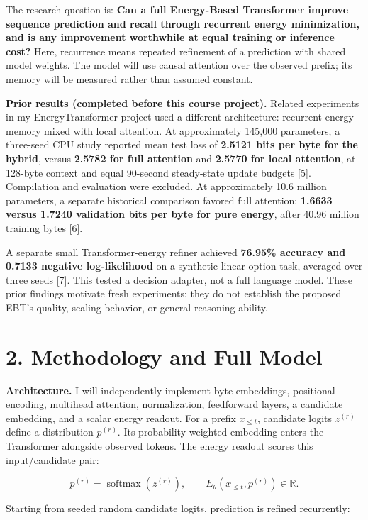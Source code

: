 \documentclass[11pt,letterpaper]{article}
\begin{document}
The research question is: \textbf{Can a full Energy-Based Transformer improve sequence prediction and recall through recurrent energy minimization, and is any improvement worthwhile at equal training or inference cost?} Here, recurrence means repeated refinement of a prediction with shared model weights. The model will use causal attention over the observed prefix; its memory will be measured rather than assumed constant.

\textbf{Prior results (completed before this course project).} Related experiments in my EnergyTransformer project used a different architecture: recurrent energy memory mixed with local attention. At approximately 145,000 parameters, a three-seed CPU study reported mean test loss of \textbf{2.5121 bits per byte for the hybrid}, versus \textbf{2.5782 for full attention} and \textbf{2.5770 for local attention}, at 128-byte context and equal 90-second steady-state update budgets [5]. Compilation and evaluation were excluded. At approximately 10.6 million parameters, a separate historical comparison favored full attention: \textbf{1.6633 versus 1.7240 validation bits per byte for pure energy}, after 40.96 million training bytes [6].

A separate small Transformer-energy refiner achieved \textbf{76.95\% accuracy and 0.7133 negative log-likelihood} on a synthetic linear option task, averaged over three seeds [7]. This tested a decision adapter, not a full language model. These prior findings motivate fresh experiments; they do not establish the proposed EBT's quality, scaling behavior, or general reasoning ability.

\newpage
\section*{2. Methodology and Full Model}

\textbf{Architecture.} I will independently implement byte embeddings, positional encoding, multihead attention, normalization, feedforward layers, a candidate embedding, and a scalar energy readout. For a prefix \(x_{\leq t}\), candidate logits \(z^{(r)}\) define a distribution \(p^{(r)}\). Its probability-weighted embedding enters the Transformer alongside observed tokens. The energy readout scores this input/candidate pair:

\[
p^{(r)}=\operatorname{softmax}(z^{(r)}),\qquad
E_\theta(x_{\leq t},p^{(r)})\in\mathbb{R}.
\]

Starting from seeded random candidate logits, prediction is refined recurrently:
\end{document}
